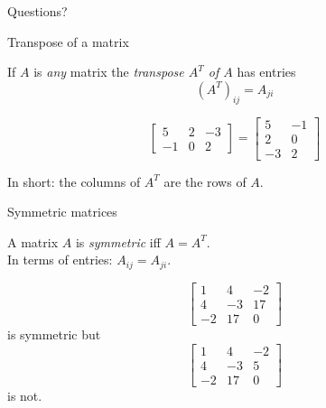 \documentclass{beamer}
\begin{document}
\begin{frame}
  Questions?
\end{frame}

\begin{frame}{Transpose of a matrix}
  \begin{definition}
    If $A$ is \emph{any} matrix the \emph{transpose $A^T$ of $A$} has entries
    \begin{equation*}
      (A^T)_{ij} = A_{ji}
    \end{equation*}
  \end{definition}
  \begin{example}
    \begin{equation*}
      \left[
        \begin{array}{ccc}
          5 & 2 & -3\\
          -1 & 0 & 2
        \end{array}
      \right] =
      \left[
        \begin{array}{cc}
          5 & -1\\
          2 & 0\\
          -3 & 2
        \end{array}
      \right]
    \end{equation*}
  \end{example}
  In short: the columns of $A^T$ are the rows of $A$.
\end{frame}

\begin{frame}{Symmetric matrices}
  \begin{definition}
    A matrix $A$ is \emph{symmetric} iff $A = A^T$.\\
    In terms of entries: $A_{ij} = A_{ji}$.
  \end{definition}
  \begin{example}
    \begin{equation*}
      \left[
      \begin{array}{ccc}
        1 & 4 & -2\\
        4 & -3 & 17\\
        -2 & 17 & 0
      \end{array}
      \right]
    \end{equation*}
    is symmetric but
    \begin{equation*}
      \left[
      \begin{array}{ccc}
	1 & 4 & -2\\
        4 & -3 & 5\\
        -2 & 17 & 0
      \end{array}
      \right]
    \end{equation*}
    is not.
  \end{example}
\end{frame}
\end{document}
